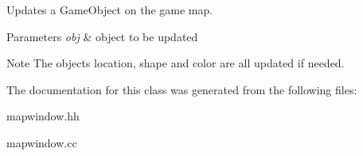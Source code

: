 Updates a Game\-Object on the game map. 


\begin{DoxyParams}{Parameters}
{\em obj} & object to be updated \\
\hline
\end{DoxyParams}
\begin{DoxyNote}{Note}
The objects location, shape and color are all updated if needed. 
\end{DoxyNote}


The documentation for this class was generated from the following files\-:\begin{DoxyCompactItemize}
\item 
mapwindow.\-hh\item 
mapwindow.\-cc\end{DoxyCompactItemize}
